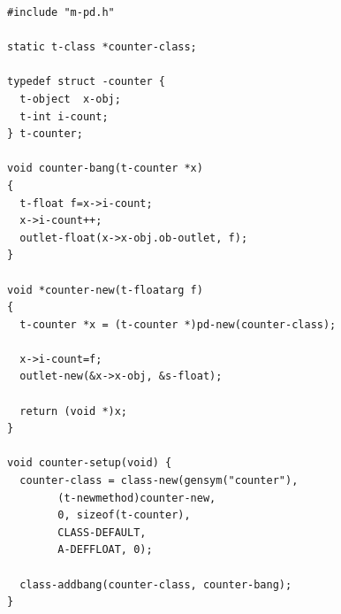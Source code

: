 \documentclass{ppgmus}
\begin{document}
\begin{verbatim}
#include "m-pd.h"

static t-class *counter-class;

typedef struct -counter {
  t-object  x-obj;
  t-int i-count;
} t-counter;

void counter-bang(t-counter *x)
{
  t-float f=x->i-count;
  x->i-count++;
  outlet-float(x->x-obj.ob-outlet, f);
}

void *counter-new(t-floatarg f)
{
  t-counter *x = (t-counter *)pd-new(counter-class);

  x->i-count=f;
  outlet-new(&x->x-obj, &s-float);

  return (void *)x;
}

void counter-setup(void) {
  counter-class = class-new(gensym("counter"),
        (t-newmethod)counter-new,
        0, sizeof(t-counter),
        CLASS-DEFAULT,
        A-DEFFLOAT, 0);

  class-addbang(counter-class, counter-bang);
}
\end{verbatim}
\end{document}
